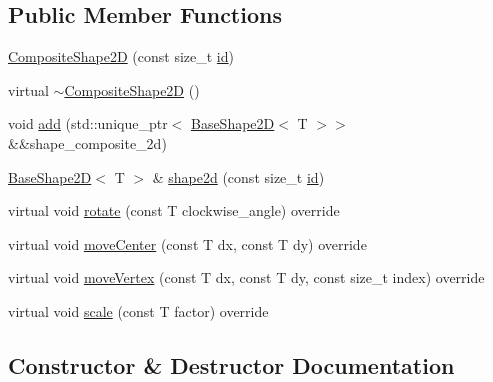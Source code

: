 \subsection*{Public Member Functions}
\begin{DoxyCompactItemize}
\item 
\hyperlink{classGraphicalEditorCore_1_1CompositeShape2D_af8dcc9f1047e1594cfbe61b62dd6a0ce}{Composite\+Shape2D} (const size\+\_\+t \hyperlink{classGraphicalEditorCore_1_1BaseShape2D_ac66cfa23289ae36d70ff6b7c41dd791f}{id})
\item 
virtual \hyperlink{classGraphicalEditorCore_1_1CompositeShape2D_a0a5658b8caf83f1578ed32b762e5db2c}{$\sim$\+Composite\+Shape2D} ()
\item 
void \hyperlink{classGraphicalEditorCore_1_1CompositeShape2D_afa65e170aed5aa31d67b1f541c24f656}{add} (std\+::unique\+\_\+ptr$<$ \hyperlink{classGraphicalEditorCore_1_1BaseShape2D}{Base\+Shape2D}$<$ T $>$$>$ \&\&shape\+\_\+composite\+\_\+2d)
\item 
\hyperlink{classGraphicalEditorCore_1_1BaseShape2D}{Base\+Shape2D}$<$ T $>$ \& \hyperlink{classGraphicalEditorCore_1_1CompositeShape2D_a4cfefba661a2a6652ec2554e77ecba71}{shape2d} (const size\+\_\+t \hyperlink{classGraphicalEditorCore_1_1BaseShape2D_ac66cfa23289ae36d70ff6b7c41dd791f}{id})
\item 
virtual void \hyperlink{classGraphicalEditorCore_1_1CompositeShape2D_a1ad124ab5448a4276d06742318744473}{rotate} (const T clockwise\+\_\+angle) override
\item 
virtual void \hyperlink{classGraphicalEditorCore_1_1CompositeShape2D_a16cb9751cbd8f587f7f68ce831314e14}{move\+Center} (const T dx, const T dy) override
\item 
virtual void \hyperlink{classGraphicalEditorCore_1_1CompositeShape2D_a2754d592f39a2c442681fad8039e682f}{move\+Vertex} (const T dx, const T dy, const size\+\_\+t index) override
\item 
virtual void \hyperlink{classGraphicalEditorCore_1_1CompositeShape2D_ae1d0a3270ae8eeec8a87c5a37d657336}{scale} (const T factor) override
\end{DoxyCompactItemize}


\subsection{Constructor \& Destructor Documentation}
